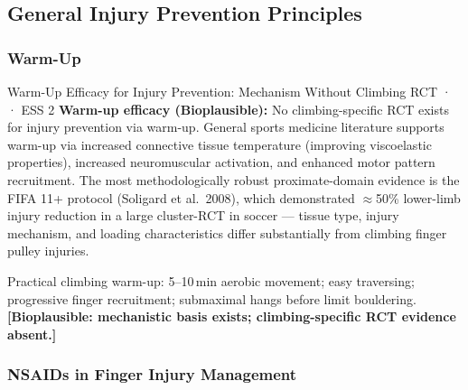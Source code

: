 \subsection{General Injury Prevention Principles}
\label{subsec:prevention}

\subsubsection{Warm-Up}

\begin{bioplausbox}{Warm-Up Efficacy for Injury Prevention: Mechanism Without Climbing RCT · \bioplausible · ESS 2}
\textbf{Warm-up efficacy (Bioplausible):} No climbing-specific RCT exists for injury prevention via warm-up. General sports medicine literature supports warm-up via increased connective tissue temperature (improving viscoelastic properties), increased neuromuscular activation, and enhanced motor pattern recruitment. The most methodologically robust proximate-domain evidence is the FIFA 11+ protocol (Soligard et al.\ 2008), which demonstrated $\approx$50\% lower-limb injury reduction in a large cluster-RCT in soccer --- tissue type, injury mechanism, and loading characteristics differ substantially from climbing finger pulley injuries.

Practical climbing warm-up: 5--10\,min aerobic movement; easy traversing; progressive finger recruitment; submaximal hangs before limit bouldering. \textbf{[Bioplausible: mechanistic basis exists; climbing-specific RCT evidence absent.]}
\end{bioplausbox}

\subsubsection{NSAIDs in Finger Injury Management}


